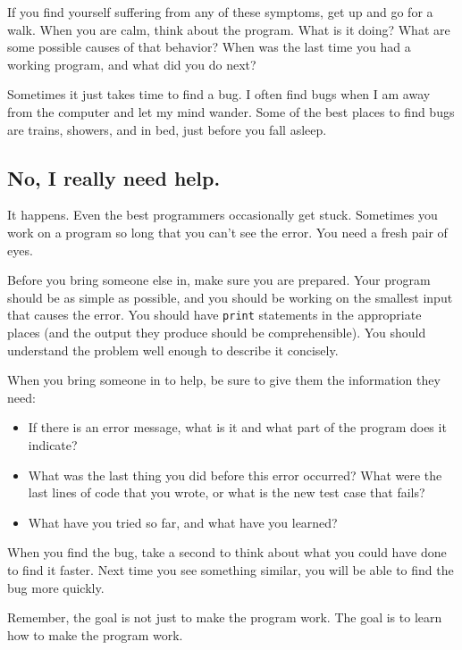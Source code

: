 \documentclass[10pt]{book}
\begin{document}
If you find yourself suffering from any of these symptoms, get
up and go for a walk.  When you are calm, think about the program.
What is it doing?  What are some possible causes of that
behavior?  When was the last time you had a working program,
and what did you do next?

Sometimes it just takes time to find a bug.  I often find bugs
when I am away from the computer and let my mind wander.  Some
of the best places to find bugs are trains, showers, and in bed,
just before you fall asleep.


\subsection{No, I really need help.}

It happens.  Even the best programmers occasionally get stuck.
Sometimes you work on a program so long that you can't see the
error.  You need a fresh pair of eyes.

Before you bring someone else in, make sure you are prepared.
Your program should be as simple
as possible, and you should be working on the smallest input
that causes the error.  You should have {\tt print} statements in the
appropriate places (and the output they produce should be
comprehensible).  You should understand the problem well enough
to describe it concisely.

When you bring someone in to help, be sure to give
them the information they need:

\begin{itemize}

\item If there is an error message, what is it
and what part of the program does it indicate?

\item What was the last thing you did before this error occurred?
What were the last lines of code that you wrote, or what is
the new test case that fails?

\item What have you tried so far, and what have you learned?

\end{itemize}

When you find the bug, take a second to think about what you
could have done to find it faster.  Next time you see something
similar, you will be able to find the bug more quickly.

Remember, the goal is not just to make the program
work.  The goal is to learn how to make the program work.
\end{document}
